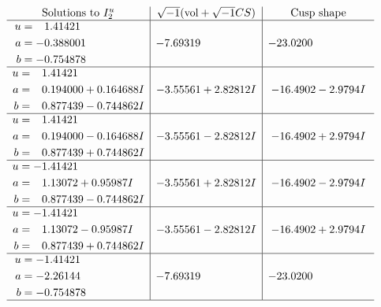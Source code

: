 \documentclass[1p]{elsarticle_modified}
\theoremstyle{definition}
\newcommand{\I}{\sqrt{-1}}
\begin{document}
$$\begin{array}{c|c|c}  
\text{Solutions to }I^u_{2}& \I (\text{vol} + \sqrt{-1}CS) & \text{Cusp shape}\\
 \hline 
\begin{aligned}
u &= \phantom{-}1.41421\phantom{ +0.000000I} \\
a &= -0.388001\phantom{ +0.000000I} \\
b &= -0.754878\phantom{ +0.000000I}\end{aligned}
 & -7.69319\phantom{ +0.000000I} & -23.0200\phantom{ +0.000000I} \\ \hline\begin{aligned}
u &= \phantom{-}1.41421\phantom{ +0.000000I} \\
a &= \phantom{-}0.194000 + 0.164688 I \\
b &= \phantom{-}0.877439 - 0.744862 I\end{aligned}
 & -3.55561 + 2.82812 I & -16.4902 - 2.9794 I \\ \hline\begin{aligned}
u &= \phantom{-}1.41421\phantom{ +0.000000I} \\
a &= \phantom{-}0.194000 - 0.164688 I \\
b &= \phantom{-}0.877439 + 0.744862 I\end{aligned}
 & -3.55561 - 2.82812 I & -16.4902 + 2.9794 I \\ \hline\begin{aligned}
u &= -1.41421\phantom{ +0.000000I} \\
a &= \phantom{-}1.13072 + 0.95987 I \\
b &= \phantom{-}0.877439 - 0.744862 I\end{aligned}
 & -3.55561 + 2.82812 I & -16.4902 - 2.9794 I \\ \hline\begin{aligned}
u &= -1.41421\phantom{ +0.000000I} \\
a &= \phantom{-}1.13072 - 0.95987 I \\
b &= \phantom{-}0.877439 + 0.744862 I\end{aligned}
 & -3.55561 - 2.82812 I & -16.4902 + 2.9794 I \\ \hline\begin{aligned}
u &= -1.41421\phantom{ +0.000000I} \\
a &= -2.26144\phantom{ +0.000000I} \\
b &= -0.754878\phantom{ +0.000000I}\end{aligned}
 & -7.69319\phantom{ +0.000000I} & -23.0200\phantom{ +0.000000I}\\
 \hline 
 \end{array}$$\newpage\newpage\renewcommand{\arraystretch}{1}
\end{document}

